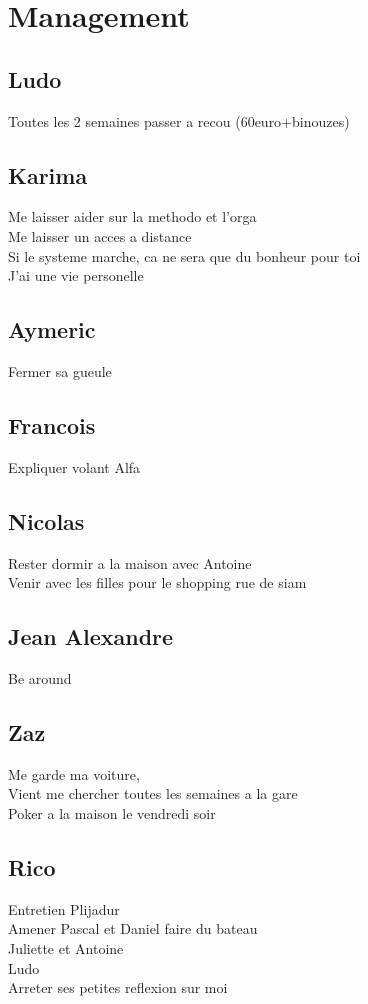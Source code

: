\documentclass[8pt]{article} %
\begin{document}
\section{Management}
\subsection{Ludo}
	Toutes les 2 semaines passer a recou (60euro+binouzes)\\
\subsection{Karima}
	Me laisser aider sur la methodo et l'orga\\
	Me laisser un acces a distance\\
	Si le systeme marche, ca ne sera que du bonheur pour toi\\
	J'ai une vie personelle\\
\subsection{Aymeric}
	Fermer sa gueule\\
\subsection{Francois}
	Expliquer volant Alfa\\
\subsection{Nicolas}
	Rester dormir a la maison avec Antoine\\
	Venir avec les filles pour le shopping rue de siam\\
\subsection{Jean Alexandre}
	Be around\\
\subsection{Zaz}
	Me garde ma voiture, \\
	Vient me chercher toutes les semaines a la gare\\
	Poker a la maison le vendredi soir\\
\subsection{Rico}
	Entretien Plijadur\\
	Amener Pascal et Daniel faire du bateau\\
	Juliette et Antoine\\
	Ludo\\
	Arreter ses petites reflexion sur moi\\
\end{document}
